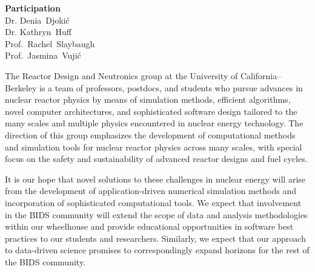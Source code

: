 \documentclass[a4paper, 12pt]{article}
\newcommand{\authorname}{Reactor Design and Neutronics Group}
\newcommand{\longauthorname}{Dr. Denia~Djoki\'{c}\\Dr.  Kathryn~Huff\\Prof.~Rachel~Slaybaugh\\Prof.~Jasmina~Vuji\'{c} }
\newcommand{\authorsite}{ucb-rdn.github.com}
\begin{document}
\pagestyle{fancy}
\lhead{\textcolor{gray}{\it \authorname}}
\rhead{\textcolor{gray}{\thepage/\totalpages{}}}
\renewcommand{\headrulewidth}{0pt} 
\renewcommand{\footrulewidth}{0pt} 
\fancyfoot[C]{\footnotesize \textcolor{gray}{\authorsite}} 

\begin{center}
{\LARGE \bf Participation}\\
\vspace*{0.1cm}
{\normalsize \longauthorname}
\end{center}




The Reactor Design and Neutronics group at the University of 
California--Berkeley \cite{reactor_design_and_neutronics_university_2013} is a team of professors, 
postdocs, and students who pursue advances in nuclear reactor physics by means of 
simulation methods, efficient algorithms, novel computer architectures, and 
sophisticated software design tailored to the many scales and multiple physics 
encountered in nuclear energy technology.  The direction of this group 
emphasizes the development of computational methods and simulation tools for 
nuclear reactor physics across many scales, with special focus on the safety and 
sustainability of advanced reactor designs and fuel cycles.  

It is our hope that novel solutions to these challenges in nuclear 
energy will arise from the development of application-driven numerical 
simulation methods and incorporation of sophisticated computational tools.  
We expect that involvement in the BIDS community will extend the 
scope of data and analysis methodologies within our wheelhouse and provide 
educational opportunities in software best practices to our students and 
researchers. Similarly, we expect that our approach to data-driven science 
promises to correspondingly expand horizons for the rest of the BIDS community.
\end{document}
